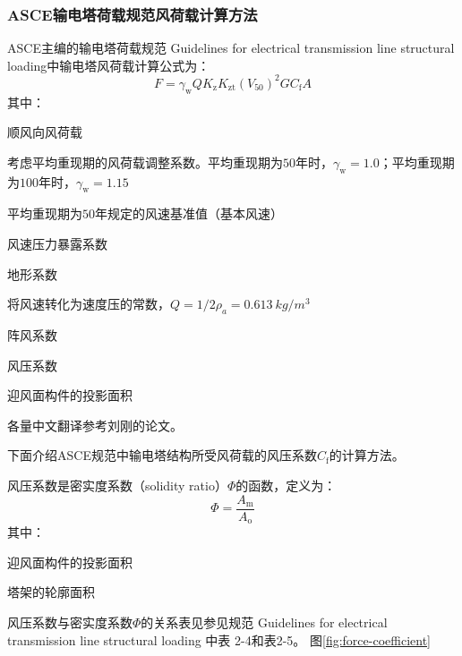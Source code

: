 \subsubsection{ASCE输电塔荷载规范风荷载计算方法}
ASCE主编的输电塔荷载规范 Guidelines for electrical transmission line structural loading\cite{wong2009guidelines}中输电塔风荷载计算公式为：
\begin{equation}
	F = \gamma_{\mathrm{w}} Q K_{\mathrm{z}} K_{\mathrm{zt}} \left( V_{50}\right)^2 G C_{\mathrm{f}} A
\end{equation}
其中：
\begin{description}[leftmargin=!,labelwidth=2em]
	\item[$F$] 顺风向风荷载
	\item[$\gamma_{\mathrm{w}}$] 考虑平均重现期的风荷载调整系数。平均重现期为$50$年时，$\gamma_{\mathrm{w}}=1.0$；平均重现期为$100$年时，$\gamma_{\mathrm{w}}=1.15$
	\item[$V_{50}$] 平均重现期为$50$年规定的风速基准值（基本风速）
	\item[$K_{\mathrm{z}}$] 风速压力暴露系数
	\item[$K_{\mathrm{zt}}$] 地形系数
	\item[$Q$] 将风速转化为速度压的常数，$Q=1/2 \rho_a=\SI{0.613}{kg/m^3}$
	\item[$G$] 阵风系数
	\item[$C_{\mathrm{f}}$] 风压系数
	\item[$A$] 迎风面构件的投影面积
\end{description}
各量中文翻译参考刘刚的论文\cite{liu2010wind}。

下面介绍ASCE规范中输电塔结构所受风荷载的风压系数$C_{\mathrm{f}}$的计算方法。

风压系数是密实度系数（solidity ratio）$\Phi$的函数，定义为：
\begin{equation}
	\Phi = \frac{A_\mathrm{m}}{A_\mathrm{o}}
\end{equation}
其中：
\begin{description}[leftmargin=!,labelwidth=2em]
	\item[$A_\mathrm{m}$] 迎风面构件的投影面积
	\item[$A_\mathrm{o}$] 塔架的轮廓面积
\end{description}
风压系数与密实度系数$\Phi$的关系表见参见规范 Guidelines for electrical transmission line structural loading \cite{wong2009guidelines}中表 2-4和表2-5。 图\ref{fig:force-coefficient}\cite{wong2009guidelines}



